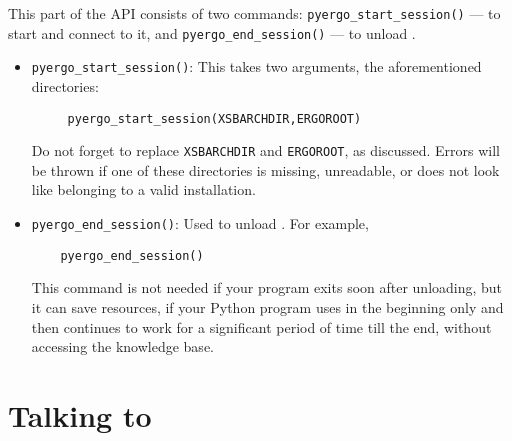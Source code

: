 This part of the
API consists of two commands: \texttt{pyergo\_start\_session()} --- to
start \ERGO and
connect to it, and \texttt{pyergo\_end\_session()} --- to unload \ERGO.  
\begin{itemize}
\item  \texttt{pyergo\_start\_session()}: This takes two arguments, 
  the aforementioned directories:
\begin{verbatim}
     pyergo_start_session(XSBARCHDIR,ERGOROOT)  
\end{verbatim}
  Do not forget to replace \texttt{XSBARCHDIR} and \texttt{ERGOROOT}, as
  discussed.  Errors will be thrown if one of these directories is missing,
  unreadable, or does not look like belonging to a valid \ERGO
  installation.
\item \texttt{pyergo\_end\_session()}: Used to unload \ERGO. For example,
\begin{verbatim}
    pyergo_end_session()  
\end{verbatim}
  This command is not needed if your program exits soon after unloading,
  but it can save resources, if your Python program uses \ERGO in the
  beginning only and then continues to work for a significant period of
  time till the end, without accessing the knowledge base.
\end{itemize}


\section{Talking to \ERGO}\label{sec-pyergo-query}

